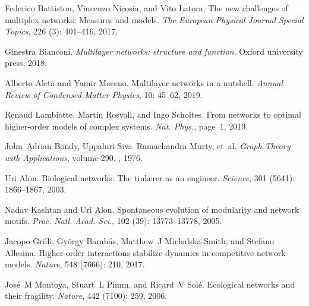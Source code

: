 Federico Battiston, Vincenzo Nicosia, and Vito Latora.
\newblock The new challenges of multiplex networks: Measures and models.
\newblock \emph{The European Physical Journal Special Topics}, 226
(3): 401--416, 2017{}.

Ginestra Bianconi.
\newblock \emph{Multilayer networks: structure and function}.
\newblock Oxford university press, 2018.

Alberto Aleta and Yamir Moreno.
\newblock Multilayer networks in a nutshell.
\newblock \emph{Annual Review of Condensed Matter Physics}, 10:
45--62, 2019.

Renaud Lambiotte, Martin Rosvall, and Ingo Scholtes.
\newblock From networks to optimal higher-order models of complex systems.
\newblock \emph{Nat. Phys.}, page~1, 2019.

John~Adrian Bondy, Uppaluri Siva~Ramachandra Murty, et~al.
\newblock \emph{Graph Theory with Applications}, volume 290.
, 1976.

Uri Alon.
\newblock Biological networks: The tinkerer as an engineer.
\newblock \emph{Science}, 301 (5641): 1866--1867, 2003.

Nadav Kashtan and Uri Alon.
\newblock Spontaneous evolution of modularity and network motifs.
\newblock \emph{Proc. Natl. Acad. Sci.}, 102 (39):
13773--13778, 2005.

Jacopo Grilli, Gy{\"o}rgy Barab{\'a}s, Matthew~J {Michalska-Smith}, and Stefano
Allesina.
\newblock Higher-order interactions stabilize dynamics in competitive network
models.
\newblock \emph{Nature}, 548 (7666): 210, 2017.

Jos{\'e}~M Montoya, Stuart~L Pimm, and Ricard~V Sol{\'e}.
\newblock Ecological networks and their fragility.
\newblock \emph{Nature}, 442 (7100): 259, 2006.

